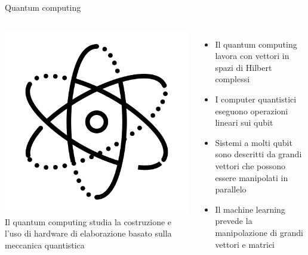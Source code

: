 \documentclass{beamer}
\begin{document}
    \begin{frame}{Quantum computing}
        \begin{columns}
            \includegraphics[width=\textwidth]{gfx/icons/icons8-physics-480}
            Il quantum computing studia la costruzione e l'uso di hardware di elaborazione basato sulla meccanica quantistica
            \begin{itemize}
                \item Il quantum computing lavora con vettori in spazi di Hilbert complessi
                \item I computer quantistici eseguono operazioni lineari sui qubit
                \item Sistemi a molti qubit sono descritti da grandi vettori che possono essere manipolati in parallelo
                \item Il machine learning prevede la manipolazione di grandi vettori e matrici
            \end{itemize}
        \end{columns}
    \end{frame}
\end{document}
